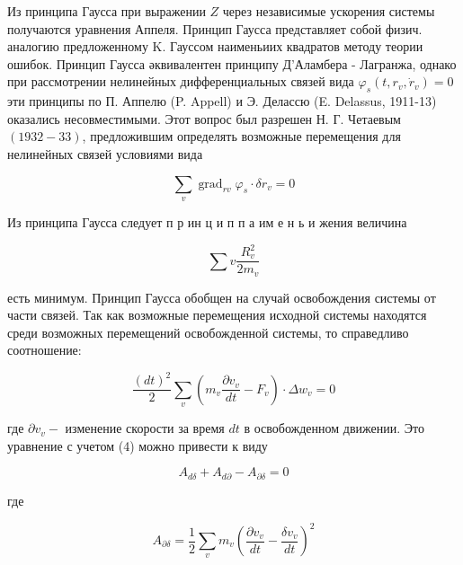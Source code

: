 \documentclass[10pt]{article}
\begin{document}
Из принципа Гаусса при выражении $Z$ через независимые ускорения системы получаются уравнения Аппеля. Принцип Гаусса представляет собой физич. аналогию предложенному $\mathrm{K}$. Гауссом наименьиих квадратов методу теории ошибок. Принцип Гаусса әквивалентен принципу Д'Аламбера - Лагранжа, однако при рассмотрении нелинейных дифференциальных связей вида $\varphi_{s}\left(t, r_{v}, \dot{r}_{v}\right)=0$ эти принципы по П. Аппелю (P. Appell) и Э. Делассю (E. Delassus, 1911-13) оказались несовместимыми. Этот вопрос был разрешен Н. Г. Четаевым $(1932-33)$, предложившим определять возможные перемещения для нелинейных связей условиями вида



\[

\sum_{v} \operatorname{grad}_{r v} \varphi_{s} \cdot \delta r_{v}=0

\]



Из принципа Гаусса следует п р ин ц и п п а им е н ь и жения величина



\[

\sum v \frac{R_{v}^{2}}{2 m_{v}}

\]



есть минимум. Принцип Гаусса обобщен на случай освобождения системы от части связей. Так как возможные перемещения исходной системы находятся среди возможных перемещений освобожденной системы, то справедливо соотношение:



\[

\frac{(d t)^{2}}{2} \sum_{v}\left(m_{v} \frac{\partial v_{v}}{d t}-F_{v}\right) \cdot \Delta w_{v}=0

\]



где $\partial v_{v}-$ изменение скорости за время $d t$ в освобожденном движении. Это уравнение с учетом (4) можно привести к виду



\[

A_{d \delta}+A_{d \partial}-A_{\partial \delta}=0

\]



где



\[

A_{\partial \delta}=\frac{1}{2} \sum_{v} m_{v}\left(\frac{\partial v_{v}}{d t}-\frac{\delta v_{v}}{d t}\right)^{2}

\]
\end{document}
